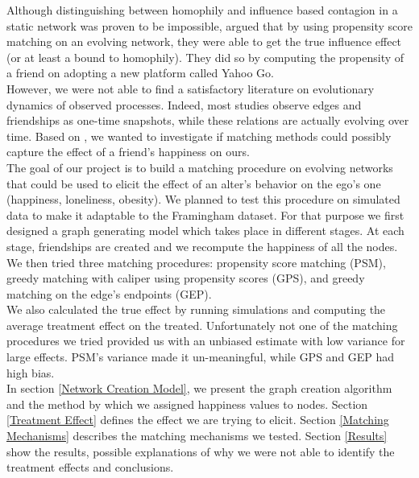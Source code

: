 \documentclass[11pt]{article}
\begin{document}
Although distinguishing between homophily and influence based contagion in a static network was proven to be impossible, \cite{aral2009distinguishing} argued that by using propensity score matching on an evolving network, they were able to get the true influence effect (or at least a bound to homophily). They did so by computing the propensity of a friend on adopting a new platform called Yahoo Go.\\

However, we were not able to find a satisfactory literature on evolutionary dynamics of observed processes. Indeed, most studies observe edges and friendships as one-time snapshots, while these relations are actually evolving over time. Based on \cite{aral2009distinguishing}, we wanted to investigate if matching methods could possibly capture the effect of a friend's happiness on ours.\\

The goal of our project is to build a matching procedure on evolving networks that could be used to elicit the effect of an alter's behavior on the ego's one (happiness, loneliness, obesity). We planned to test this procedure on simulated data to make it adaptable to the Framingham dataset. For that purpose we first designed a graph generating model which takes place in different stages. At each stage, friendships are created and we recompute the happiness of all the nodes. We then tried three matching procedures: propensity score matching (PSM), greedy matching with caliper using propensity scores (GPS), and greedy matching on the edge’s endpoints (GEP).\\

We also calculated the true effect by running simulations and computing the average treatment effect on the treated. Unfortunately not one of the matching procedures we tried provided us with an unbiased estimate with low variance for large effects. PSM’s variance made it un-meaningful, while GPS and GEP had high bias.\\

In section \ref{Network Creation Model}, we present the graph creation algorithm and the method by which we assigned happiness values to nodes. Section \ref{Treatment Effect} defines the effect we are trying to elicit. Section \ref{Matching Mechanisms} describes the matching mechanisms we tested. Section \ref{Results} show the results, possible explanations of why we were not able to identify the treatment effects and conclusions.\\
\end{document}
